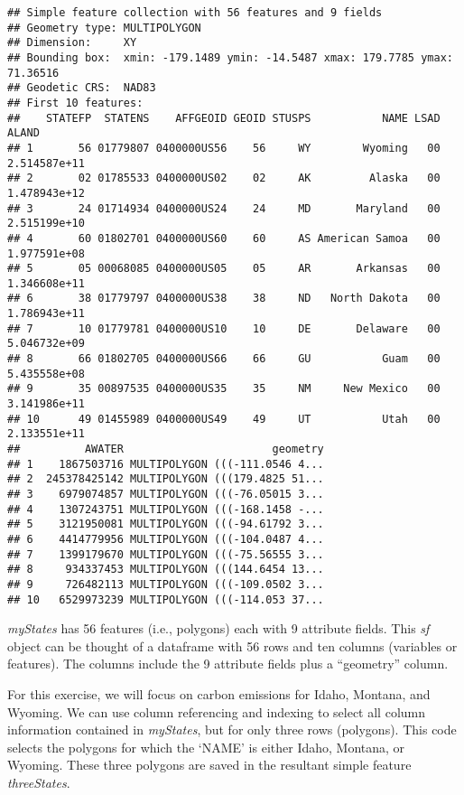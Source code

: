 \documentclass[
]{article}
\begin{document}
\begin{verbatim}
## Simple feature collection with 56 features and 9 fields
## Geometry type: MULTIPOLYGON
## Dimension:     XY
## Bounding box:  xmin: -179.1489 ymin: -14.5487 xmax: 179.7785 ymax: 71.36516
## Geodetic CRS:  NAD83
## First 10 features:
##    STATEFP  STATENS    AFFGEOID GEOID STUSPS           NAME LSAD        ALAND
## 1       56 01779807 0400000US56    56     WY        Wyoming   00 2.514587e+11
## 2       02 01785533 0400000US02    02     AK         Alaska   00 1.478943e+12
## 3       24 01714934 0400000US24    24     MD       Maryland   00 2.515199e+10
## 4       60 01802701 0400000US60    60     AS American Samoa   00 1.977591e+08
## 5       05 00068085 0400000US05    05     AR       Arkansas   00 1.346608e+11
## 6       38 01779797 0400000US38    38     ND   North Dakota   00 1.786943e+11
## 7       10 01779781 0400000US10    10     DE       Delaware   00 5.046732e+09
## 8       66 01802705 0400000US66    66     GU           Guam   00 5.435558e+08
## 9       35 00897535 0400000US35    35     NM     New Mexico   00 3.141986e+11
## 10      49 01455989 0400000US49    49     UT           Utah   00 2.133551e+11
##          AWATER                       geometry
## 1    1867503716 MULTIPOLYGON (((-111.0546 4...
## 2  245378425142 MULTIPOLYGON (((179.4825 51...
## 3    6979074857 MULTIPOLYGON (((-76.05015 3...
## 4    1307243751 MULTIPOLYGON (((-168.1458 -...
## 5    3121950081 MULTIPOLYGON (((-94.61792 3...
## 6    4414779956 MULTIPOLYGON (((-104.0487 4...
## 7    1399179670 MULTIPOLYGON (((-75.56555 3...
## 8     934337453 MULTIPOLYGON (((144.6454 13...
## 9     726482113 MULTIPOLYGON (((-109.0502 3...
## 10   6529973239 MULTIPOLYGON (((-114.053 37...
\end{verbatim}

\emph{myStates} has 56 features (i.e., polygons) each with 9 attribute
fields. This \emph{sf} object can be thought of a dataframe with 56 rows
and ten columns (variables or features). The columns include the 9
attribute fields plus a ``geometry'' column.

For this exercise, we will focus on carbon emissions for Idaho, Montana,
and Wyoming. We can use column referencing and indexing to select all
column information contained in \emph{myStates}, but for only three rows
(polygons). This code selects the polygons for which the `NAME' is
either Idaho, Montana, or Wyoming. These three polygons are saved in the
resultant simple feature \emph{threeStates}.
\end{document}
